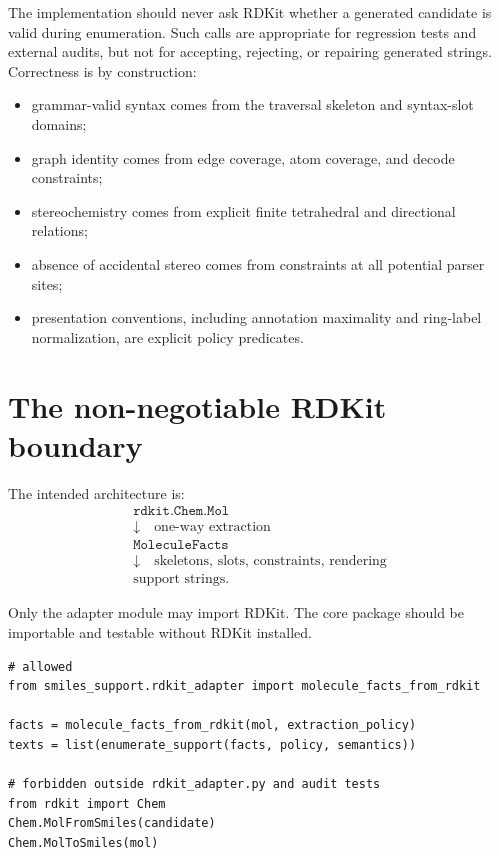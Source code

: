 \documentclass[10pt,a4paper]{article}
\theoremstyle{definition}
\theoremstyle{remark}
\begin{document}
The implementation should never ask RDKit whether a generated candidate is valid
during enumeration.  Such calls are appropriate for regression tests and external
audits, but not for accepting, rejecting, or repairing generated strings.
Correctness is by construction:
\begin{itemize}[leftmargin=*]
\item grammar-valid syntax comes from the traversal skeleton and syntax-slot
      domains;
\item graph identity comes from edge coverage, atom coverage, and decode
      constraints;
\item stereochemistry comes from explicit finite tetrahedral and directional
      relations;
\item absence of accidental stereo comes from constraints at all potential
      parser sites;
\item presentation conventions, including annotation maximality and ring-label
      normalization, are explicit policy predicates.
\end{itemize}

\section{The non-negotiable RDKit boundary}
\label{s:boundary}

The intended architecture is:
\[
\begin{array}{c}
\texttt{rdkit.Chem.Mol} \\
\downarrow\quad \text{one-way extraction} \\
\texttt{MoleculeFacts} \\
\downarrow\quad \text{skeletons, slots, constraints, rendering} \\
\text{support strings}.
\end{array}
\]

Only the adapter module may import RDKit.  The core package should be importable
and testable without RDKit installed.

\begin{lstlisting}
# allowed
from smiles_support.rdkit_adapter import molecule_facts_from_rdkit

facts = molecule_facts_from_rdkit(mol, extraction_policy)
texts = list(enumerate_support(facts, policy, semantics))

# forbidden outside rdkit_adapter.py and audit tests
from rdkit import Chem
Chem.MolFromSmiles(candidate)
Chem.MolToSmiles(mol)
\end{lstlisting}
\end{document}
